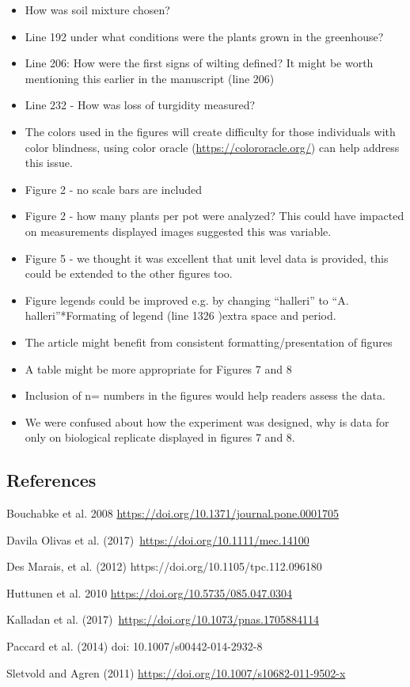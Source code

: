 \documentclass[10pt]{article}
\providecommand{\tightlist}{\setlength{\itemsep}{0pt}\setlength{\parskip}{0pt}}%
\begin{document}
\begin{itemize}
\tightlist
\item
  How was soil mixture chosen?
\item
  Line 192 under what conditions were the plants grown in the
  greenhouse?
\item
  Line 206: How were the first signs of wilting defined? It might be
  worth mentioning this earlier in the manuscript (line 206)
\item
  Line 232 - How was loss of turgidity measured?
\item
  The colors used in the figures will create difficulty for those
  individuals with color blindness, using color oracle
  (\url{https://colororacle.org/}) can help address this issue.
\item
  Figure 2 - no scale bars are included
\item
  Figure 2 - how many plants per pot were analyzed? This could have
  impacted on measurements displayed images suggested this was variable.
\item
  Figure 5 - we thought it was excellent that unit level data is
  provided, this could be extended to the other figures too.
\item
  Figure legends could be improved e.g. by changing ``halleri'' to ``A.
  halleri''*Formating of legend (line 1326 )extra space and period.
\item
  The article might benefit from consistent formatting/presentation of
  figures
\item
  A table might be more appropriate for Figures 7 and 8
\item
  Inclusion of n= numbers in the figures would help readers assess the
  data.
\item
  We were confused about how the experiment was designed, why is data
  for only on biological replicate displayed in figures 7 and 8.
\end{itemize}

\par\null

\subsection*{References}

{\label{453131}}

Bouchabke et al. 2008 \url{https://doi.org/10.1371/journal.pone.0001705}

Davila Olivas et al. (2017)~\url{https://doi.org/10.1111/mec.14100}

Des Marais, et al. (2012) https://doi.org/10.1105/tpc.112.096180

Huttunen et al. 2010 \url{https://doi.org/10.5735/085.047.0304}

Kalladan et al. (2017)~\url{https://doi.org/10.1073/pnas.1705884114}

Paccard et al. (2014) doi: 10.1007/s00442-014-2932-8

Sletvold and Agren (2011)
\url{https://doi.org/10.1007/s10682-011-9502-x}

\FloatBarrier
\end{document}
